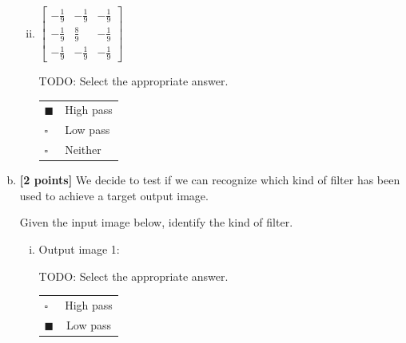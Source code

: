 \documentclass[11pt]{article}
\begin{document}
\begin{enumerate}[(a)]
\begin{enumerate}[(i)]
\begin{tcolorbox}[colback=white!5!white,colframe=green!75!black]
\end{tcolorbox}

\item
$\begin{bmatrix}
    -\frac{1}{9} & -\frac{1}{9} & -\frac{1}{9} \\
    -\frac{1}{9} & \frac{8}{9} & -\frac{1}{9} \\
    -\frac{1}{9} & -\frac{1}{9} & -\frac{1}{9}
  \end{bmatrix}$
  \begin{tcolorbox}[colback=white!5!white,colframe=green!75!black]
  
TODO: Select the appropriate answer. %

\begin{tabular}[h]{ll}
$\blacksquare$ & High pass \\
$\square$ & Low pass \\
$\square$ & Neither \\
\end{tabular}
\end{tcolorbox}
\end{enumerate}

\pagebreak

\item \textbf{[2 points]}
We decide to test if we can recognize which kind of filter has been used to achieve a target output image.

\begin{tcolorbox}[colback=orange!5!white,colframe=orange!75!black]
Given the input image below, identify the kind of filter.
\end{tcolorbox}


\begin{enumerate}[(i)]
\item
Output image 1:\\
\begin{tcolorbox}[colback=white!5!white,colframe=green!75!black]
TODO: Select the appropriate answer. %

\begin{tabular}[h]{lc}
$\square$ & High pass \\
$\blacksquare$ & Low pass \\
\end{tabular}
\end{tcolorbox}


\end{enumerate}
\end{enumerate}
\end{document}
